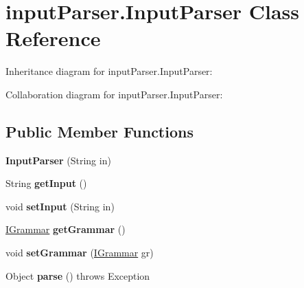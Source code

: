 \hypertarget{classinput_parser_1_1_input_parser}{\section{input\-Parser.\-Input\-Parser Class Reference}
\label{classinput_parser_1_1_input_parser}
}


Inheritance diagram for input\-Parser.\-Input\-Parser\-:


Collaboration diagram for input\-Parser.\-Input\-Parser\-:
\subsection*{Public Member Functions}
\begin{DoxyCompactItemize}
\item 
\hypertarget{classinput_parser_1_1_input_parser_a483b176df94134a641628e8856ce994a}{{\bfseries Input\-Parser} (String in)}\label{classinput_parser_1_1_input_parser_a483b176df94134a641628e8856ce994a}

\item 
\hypertarget{classinput_parser_1_1_input_parser_aad5d11e151df9b0ede3250d08fc00dfd}{String {\bfseries get\-Input} ()}\label{classinput_parser_1_1_input_parser_aad5d11e151df9b0ede3250d08fc00dfd}

\item 
\hypertarget{classinput_parser_1_1_input_parser_a9b7d170996964400a619bb3e66253a93}{void {\bfseries set\-Input} (String in)}\label{classinput_parser_1_1_input_parser_a9b7d170996964400a619bb3e66253a93}

\item 
\hypertarget{classinput_parser_1_1_input_parser_a48376a4919241160cab692fa0001974f}{\hyperlink{interfacecontext_free_1_1grammar_1_1_i_grammar}{I\-Grammar} {\bfseries get\-Grammar} ()}\label{classinput_parser_1_1_input_parser_a48376a4919241160cab692fa0001974f}

\item 
\hypertarget{classinput_parser_1_1_input_parser_a63e2fa344a4ace430bc7ad7218bc3a37}{void {\bfseries set\-Grammar} (\hyperlink{interfacecontext_free_1_1grammar_1_1_i_grammar}{I\-Grammar} gr)}\label{classinput_parser_1_1_input_parser_a63e2fa344a4ace430bc7ad7218bc3a37}

\item 
\hypertarget{classinput_parser_1_1_input_parser_a08cd69f3dbb1be117c45b4ccf5d861e6}{Object {\bfseries parse} ()  throws Exception}\label{classinput_parser_1_1_input_parser_a08cd69f3dbb1be117c45b4ccf5d861e6}

\end{DoxyCompactItemize}
